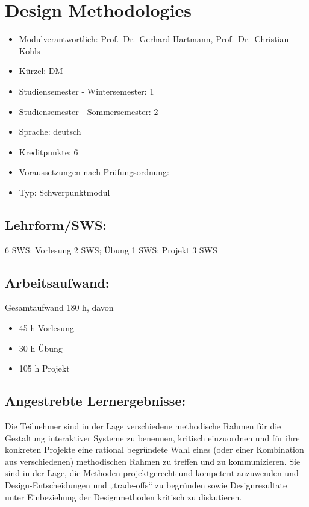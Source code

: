 \chapter{Design Methodologies}\label{design-methodologies}

\begin{itemize}
\tightlist
\item
  Modulverantwortlich: Prof.~Dr.~Gerhard Hartmann, Prof.~Dr.~Christian
  Kohls
\item
  Kürzel: DM
\item
  Studiensemester - Wintersemester: 1
\item
  Studiensemester - Sommersemester: 2
\item
  Sprache: deutsch
\item
  Kreditpunkte: 6
\item
  Voraussetzungen nach Prüfungsordnung:
\item
  Typ: Schwerpunktmodul
\end{itemize}

\section*{Lehrform/SWS:}\label{lehrformsws-4}

6 SWS: Vorlesung 2 SWS; Übung 1 SWS; Projekt 3 SWS

\section*{Arbeitsaufwand:}\label{arbeitsaufwand-10}

Gesamtaufwand 180 h, davon

\begin{itemize}
\tightlist
\item
  45 h Vorlesung
\item
  30 h Übung
\item
  105 h Projekt
\end{itemize}

\section*{Angestrebte
Lernergebnisse:}\label{angestrebte-lernergebnisse-4}

Die Teilnehmer sind in der Lage verschiedene methodische Rahmen für die
Gestaltung interaktiver Systeme zu benennen, kritisch einzuordnen und
für ihre konkreten Projekte eine rational begründete Wahl eines (oder
einer Kombination aus verschiedenen) methodischen Rahmen zu treffen und
zu kommunizieren. Sie sind in der Lage, die Methoden projektgerecht und
kompetent anzuwenden und Design-Entscheidungen und „trade-offs`` zu
begründen sowie Designresultate unter Einbeziehung der Designmethoden
kritisch zu diskutieren.

